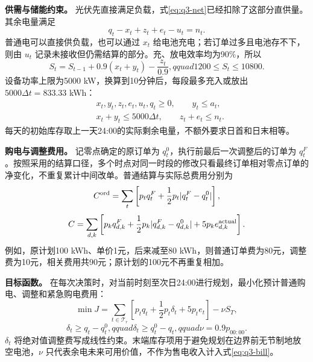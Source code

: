 \documentclass[11pt,a4paper]{article}
\begin{document}
\textbf{供需与储能约束。} 光伏先直接满足负载，式\eqref{eq:q3-net}已经扣除了这部分直供量。其余电量满足
\begin{equation}
q_t-x_t+z_t+e_t-u_t=n_t.
\label{eq:q3-balance}
\end{equation}
普通电可以直接供负载，也可以通过 $x_t$ 给电池充电；若订单过多且电池存不下，则由 $u_t$ 记录未接收但仍需结算的部分。充、放电效率均为90\%，所以
\begin{equation}
S_t=S_{t-1}+0.9(x_t+y_t)-\frac{z_t}{0.9},qquad
1200\le S_t\le10800.
\label{eq:q3-storage}
\end{equation}
设备功率上限为5000 kW，换算到10分钟后，每段最多充入或放出 $5000\Delta t=833.33$ kWh：
\begin{equation}
\begin{aligned}
&x_t,y_t,z_t,e_t,u_t,q_t\ge0,\qquad y_t\le a_t,\\
&x_t+y_t\le5000\Delta t,\qquad z_t+e_t\le n_t.
\end{aligned}
\label{eq:q3-bounds}
\end{equation}
每天的初始库存取上一天24:00的实际剩余电量，不额外要求日首和日末相等。

\textbf{购电与调整费用。} 记零点确定的原订单为 $q_t^0$，执行前最后一次调整后的订单为 $q_t^F$。按照采用的结算口径，多个时点对同一时段的修改只看最终订单相对零点订单的净变化，不重复累计中间改单。普通结算与实际总费用分别为
\begin{equation}
C^{\rm ord}=\sum_t\left[p_tq_t^F+\frac12p_t|q_t^F-q_t^0|\right],
\label{eq:q3-ordinary}
\end{equation}
\begin{equation}
C=\sum_{d,k}\left[p_kq_{d,k}^F+\frac12p_k|q_{d,k}^F-q_{d,k}^0|
+5p_ke^{\rm actual}_{d,k}\right].
\label{eq:q3-bill}
\end{equation}
例如，原计划100 kWh、单价1元，后来减至80 kWh，则普通订单费为80元，调整费为10元，相关费用共90元；原计划的100元不再重复相加。

\textbf{目标函数。} 在每次决策时，对当前时刻至次日24:00进行规划，最小化预计普通购电、调整和紧急购电费用：
\begin{equation}
\min J=\sum_{t\in\mathcal T_r}
\left[p_tq_t+\frac12p_t\delta_t+5p_te_t\right]-\nu S_T,
\label{eq:q3-objective}
\end{equation}
\begin{equation}
\delta_t\ge q_t-q_t^0,qquad \delta_t\ge q_t^0-q_t,qquad
\nu=0.9p_{00:00}.
\label{eq:q3-absolute}
\end{equation}
$\delta_t$ 将绝对值调整费写成线性约束。末端库存项用于避免规划在边界前无节制地放空电池，$\nu$ 只代表余电未来可用价值，不作为售电收入计入式\eqref{eq:q3-bill}。
\end{document}
